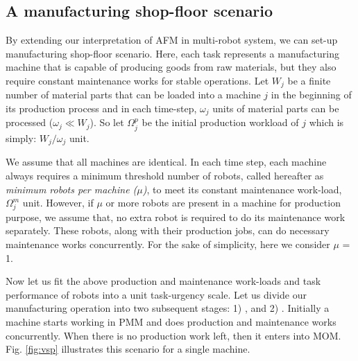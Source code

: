 \documentclass[final,5p,times,twocolumn]{elsarticle}
\begin{document}
\subsection{A manufacturing shop-floor scenario}
\label{afm:vms}
By extending our interpretation of AFM in multi-robot system, we can set-up manufacturing shop-floor  scenario. Here, each task represents a manufacturing machine that is  capable of producing goods from raw materials, but they also require constant maintenance works for stable operations. Let $W_{j}$ be a finite number of material parts that can be loaded into a machine $j$ in the beginning of its production process and in each time-step, $\omega_{j}$ units of material parts can be processed  ($\omega_{j} \ll W_{j} $). So let $\Omega_{j}^{p}$ be the initial production workload of $j$ which is simply: $W_{j} / \omega_{j}$ unit.

We assume that all machines are identical. In each time step, each machine always requires a minimum threshold number of robots, called hereafter as {\em minimum robots per machine ($\mu$)}, to meet its constant maintenance work-load, $\Omega_{j}^{m}$ unit. However, if $\mu$ or more robots are present in a machine for production purpose, we assume that, no extra robot is required to do its maintenance work separately. These robots, along with their production jobs, can do necessary maintenance works concurrently. For the sake of simplicity, here we consider $\mu$ = 1.

Now let us fit the above production and maintenance work-loads and task performance of robots into a unit task-urgency scale. Let us divide our manufacturing operation into two subsequent stages: 1) , and 2) . Initially a machine starts working in PMM and does production and maintenance works concurrently. When there is no production work left, then it  enters into MOM. Fig. \ref{fig:vsp} illustrates this scenario for a single machine.
\end{document}
